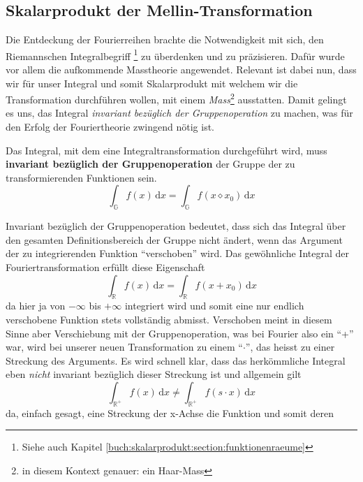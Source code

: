 \subsection{Skalarprodukt der Mellin-Transformation
\label{mellin:subsection:skalarprodukt}}
Die Entdeckung der Fourierreihen brachte die Notwendigkeit mit sich, den 
Riemannschen Integralbegriff \footnote{Siehe auch Kapitel 
\ref{buch:skalarprodukt:section:funktionenraeume}} zu überdenken und zu 
präzisieren.
Dafür wurde vor allem die aufkommende Masstheorie angewendet.
Relevant ist dabei nun, dass wir für unser Integral und somit Skalarprodukt 
mit welchem wir die Transformation durchführen wollen, 
mit einem \emph{Mass}\footnote{in diesem Kontext genauer: ein Haar-Mass} 
ausstatten. 
Damit gelingt es uns, das Integral 
\emph{invariant bezüglich der Gruppenoperation} zu machen, was für den 
Erfolg der Fouriertheorie zwingend nötig ist. 
\begin{satz}
    \label{buch:papers:mellin:teil2:satz:int}
    Das Integral, mit dem eine Integraltransformation durchgeführt wird, 
    muss \textbf{invariant bezüglich der Gruppenoperation} der Gruppe 
    der zu transformierenden Funktionen sein.
    \[
        \int_\mathbb{G} f(x)\,\mathrm{d}x 
        = \int_\mathbb{G} f(x \diamond x_0)\,\mathrm{d}x
    \]
\end{satz}
Invariant bezüglich der Gruppenoperation bedeutet, dass sich das Integral 
über den gesamten Definitionsbereich der Gruppe nicht ändert, wenn das 
Argument der zu integrierenden Funktion ``verschoben'' wird. 
Das gewöhnliche Integral der Fouriertransformation erfüllt diese 
Eigenschaft 
\begin{equation}
    \int_\mathbb{R} f(x)\,\mathrm{d}x 
    = \int_\mathbb{R} f(x + x_0)\,\mathrm{d}x
\end{equation}
da hier ja von $-\infty$ bis $+\infty$ integriert wird und somit eine nur 
endlich verschobene Funktion stets vollständig abmisst.
Verschoben meint in diesem Sinne aber Verschiebung mit der Gruppenoperation, 
was bei Fourier also ein ``+'' war, wird bei unserer neuen Transformation 
zu einem ``$\cdot$'', das heisst zu einer Streckung des Arguments. 
Es wird schnell klar, dass das herkömmliche Integral eben \emph{nicht} 
invariant bezüglich dieser Streckung ist und allgemein gilt 
\begin{equation}
    \int_\mathbb{R^+} 
    f(x)\,\mathrm{d}x \neq \int_\mathbb{R^+} f(s \cdot x)\,\mathrm{d}x
\end{equation}
da, einfach gesagt, eine Streckung der x-Achse die Funktion und somit deren

